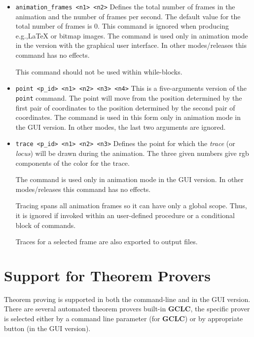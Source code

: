\documentclass[a4paper]{book}
\newcommand{\gclc}{{\bfseries GCLC}\xspace}
\begin{document}
\begin{itemize}
\item
\verb|animation_frames <n1> <n2>|
        Defines the total number of frames in the animation and the
        number of frames per second. The default value for the total
        number of frames is 0.
        This command is ignored when producing e.g.,\LaTeX{} or bitmap images.
        The command is used only in animation mode in the version with the 
        graphical user interface.
        In other modes/releases this command has no effects.

        This command should not be used within while-blocks.

\item \verb|point <p_id> <n1> <n2> <n3> <n4>|
        This is a five-arguments version of the \verb|point| command.
        The point will move from the position determined by the first
        pair of coordinates to the position determined by the
        second pair of coordinates.
        The command is used in this form only in animation mode in
        the GUI version. In other modes, the last two arguments
        are ignored.

\item \verb|trace <p_id> <n1> <n2> <n3>|
        Defines the point for which the {\em trace} (or {\em locus})
        will be drawn during the animation. The three given numbers
        give {\sc rgb} components of the color for the trace.

        The command is used only in animation mode in the GUI 
        version. In other modes/releases this command has no effects.

        Tracing spans all animation frames so it can have only a
        global scope. Thus, it is ignored if invoked within an
        user-defined procedure or a conditional block of commands.

        Traces for a selected frame are also exported to output files.
\end{itemize}



\section{Support for Theorem Provers}
\label{subsec:prover-commands}

Theorem proving is supported in both the command-line and in the GUI version.
There are several automated theorem provers built-in \gclc{},
the specific prover is selected either by a command line
parameter (for \gclc{}) or by appropriate button (in the GUI version).
\end{document}
